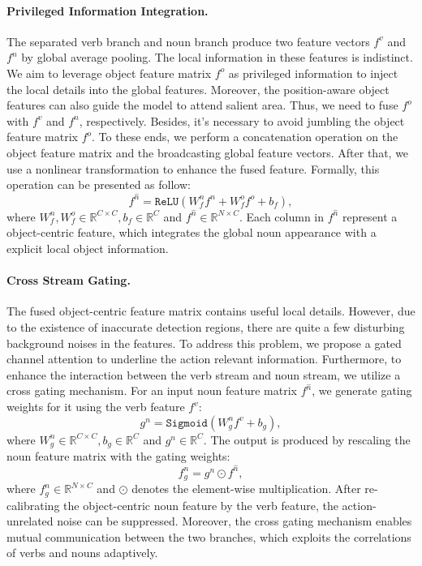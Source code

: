 \documentclass[letterpaper]{article} \usepackage{aaai20}  \usepackage{times}  \usepackage{helvet} \usepackage{courier}  \usepackage[hyphens]{url}  \usepackage{graphicx} \urlstyle{rm} \def\UrlFont{\rm}  \usepackage{graphicx}  \frenchspacing  \setlength{\pdfpagewidth}{8.5in}  \setlength{\pdfpageheight}{11in}  \usepackage{amsfonts,amssymb}
\begin{document}
\paragraph{Privileged Information Integration.}
The separated verb branch and noun branch produce two feature vectors ${f^v}$ and ${f^n}$ by global average pooling. The local information in these features is indistinct. We aim to leverage object feature matrix ${f^o}$ as privileged information to inject the local details into the global features. Moreover, the position-aware object features can also guide the model to attend salient area. Thus, we need to fuse ${f^o}$ with ${f^v}$ and ${f^n}$, respectively.
Besides, it's necessary to avoid jumbling the object feature matrix ${f^o}$. To these ends, we perform a concatenation operation on the object feature matrix and the broadcasting global feature vectors. After that, we use a nonlinear transformation to enhance the fused feature. Formally, this operation can be presented as follow:
\begin{equation}
f^{\hat{n}} = \texttt{ReLU}(W^n_f{f^n} + W^o_f{f^o}+b_f),
\end{equation}
where $W^n_f,W^o_f\in \mathbb{R}^{C\times C},b_f \in  \mathbb{R}^C$ and  ${f^{\hat{n}}} \in \mathbb{R}^{N\times C}$. Each column in ${f^{\hat{n}}}$ represent a object-centric feature, which integrates the global noun appearance with a explicit local object information. 

\paragraph{Cross Stream Gating.}
The fused object-centric feature matrix contains useful local details. However, due to the existence of inaccurate detection regions, there are quite a few disturbing background noises in the features. To address this problem, we propose a gated channel attention to underline the action relevant information. Furthermore, to enhance the interaction between the verb stream and noun stream, we utilize a cross gating mechanism. For an input noun feature matrix 
${f^{\hat{n}}}$, we generate gating weights for it using the verb feature ${f^v}$:
\begin{equation}
{g^n} = \texttt{Sigmoid}(W^n_g{f^v} + b_g),
\end{equation}
where $W^n_g \in \mathbb{R}^{C\times C}, b_g\in \mathbb{R}^{C}$ and ${g^n} \in \mathbb{R}^C$.
The output is produced by rescaling the noun feature matrix with the gating weights:
\begin{equation}
{f^n_g} = {g^n} \odot {f^{\hat{n}}},
\end{equation}
where ${f^n_g} \in \mathbb{R}^{N\times C}$ and $\odot$ denotes the element-wise multiplication.
After re-calibrating the object-centric noun feature by the verb feature, the action-unrelated noise can be suppressed.
Moreover, the cross gating mechanism enables mutual communication between the two branches, which exploits the correlations of verbs and nouns adaptively.
\end{document}
